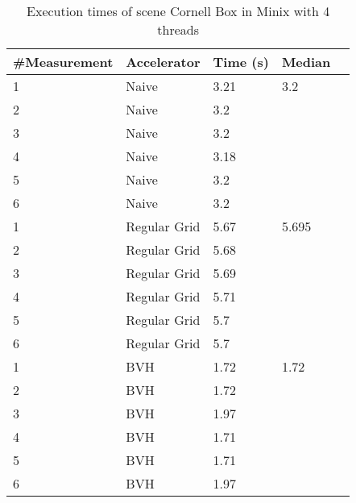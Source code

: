 \begin{table}[H]
	\small
	\begin{tabular}{|l|l|l|l|l|}
		\hline
		\#Measurement & Accelerator & Time (s) & Median \\ \hline
		1 & Naive & 3.21 & 3.2 \\ \hline
		2 & Naive & 3.2 & \\ \hline
		3 & Naive & 3.2 & \\ \hline
		4 & Naive & 3.18 & \\ \hline
		5 & Naive & 3.2 & \\ \hline
		6 & Naive & 3.2 & \\ \hline
		1 & Regular Grid & 5.67 & 5.695 \\ \hline
		2 & Regular Grid & 5.68 & \\ \hline
		3 & Regular Grid & 5.69 & \\ \hline
		4 & Regular Grid & 5.71 & \\ \hline
		5 & Regular Grid & 5.7 & \\ \hline
		6 & Regular Grid & 5.7 & \\ \hline
		1 & BVH & 1.72 & 1.72 \\ \hline
		2 & BVH & 1.72 & \\ \hline
		3 & BVH & 1.97 & \\ \hline
		4 & BVH & 1.71 & \\ \hline
		5 & BVH & 1.71 & \\ \hline
		6 & BVH & 1.97 & \\ \hline
	\end{tabular}
	\label{Time}
	\caption{Execution times of scene Cornell Box in Minix with 4 threads}
\end{table}
